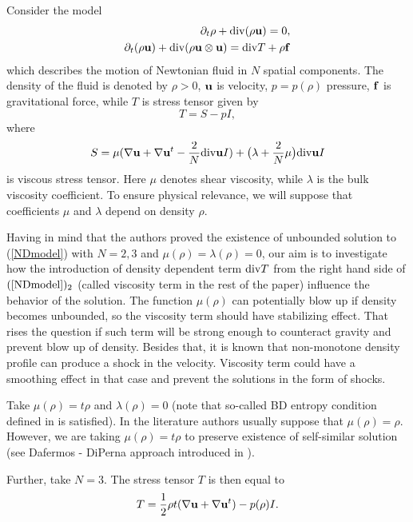 \documentclass[reqno]{article}%
\theoremstyle{plain}
\theoremstyle{definition}
\theoremstyle{remark}
\newtheorem{remark}{Remark}[section]
\renewcommand{\div}{{\rm div} }
\numberwithin{equation}{section}
\begin{document}
\medskip

Consider the model
\begin{equation}\label{NDmodel}
\begin{split}
\partial_t \rho +\div (\rho {\bf u})=0,\\
\partial_t (\rho {\bf u})+\div (\rho {\bf u}\otimes {\bf u})=\div T +\rho {\bf f} 
\end{split}
\end{equation}
which describes the motion of Newtonian fluid in $N$ spatial components. The density of the fluid is denoted by $\rho>0$, ${\bf u}$ is velocity, $p=p(\rho)$ pressure, ${\bf f}$ is gravitational force, while $T$ is stress tensor given by
\[T=S-pI,\]
where
\[S=\mu (\nabla {\bf u}+\nabla {\bf u}^t-\frac{2}{N}\div {\bf u}I)+\big(\lambda+\frac{2}{N}\mu\big) \div {\bf u}I\]
is viscous stress tensor. Here $\mu$ denotes shear viscosity, while $\lambda$ is the bulk viscosity coefficient. To ensure physical relevance, we will suppose that coefficients $\mu$ and $\lambda$ depend on density $\rho$.

Having in mind that the authors proved the existence of unbounded solution to (\ref{NDmodel}) with $N=2,3$ and $\mu(\rho)=\lambda(\rho)=0$, our aim is to investigate how the introduction of density dependent term $\div T$ from the right hand side of $(\ref{NDmodel})_2$ (called viscosity term in the rest of the paper) influence the behavior of the solution. The function $\mu(\rho)$ can potentially blow up if density becomes unbounded, so the viscosity term should have stabilizing effect. That rises the question if such  term will be strong enough to counteract gravity and prevent blow up of density. Besides that, it is known that  non-monotone density profile can produce a shock in the velocity. Viscosity term could have a smoothing effect in that case and prevent the solutions in the form of shocks.

\medskip
 

Take $\mu(\rho)=t\rho$ and $\lambda(\rho)=0$ (note that so-called BD entropy condition defined in \cite{BD} is satisfied). In the literature authors usually suppose that $\mu(\rho)=\rho$. However, we are taking $\mu(\rho)=t\rho$ to preserve existence of self-similar solution (see Dafermos 
- DiPerna approach introduced in \cite{DafermosPerna}).  


Further, take $N=3.$ 
The stress tensor $T$ is then equal to
\[T=\frac{1}{2}\rho t(\nabla {\bf u}+\nabla {\bf u}^t)-p(\rho)I.\]
\medskip
\end{document}
